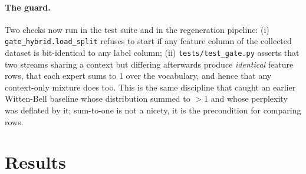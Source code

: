 \documentclass[11pt]{article}
\begin{document}
\paragraph{The guard.} Two checks now run in the test suite and in the
regeneration pipeline:
(i) \texttt{gate\_hybrid.load\_split} refuses to start if any feature column of
the collected dataset is bit-identical to any label column;
(ii) \texttt{tests/test\_gate.py} asserts that two streams sharing a context
but differing afterwards produce \emph{identical} feature rows, that each
expert sums to 1 over the vocabulary, and hence that any context-only mixture
does too. This is the same discipline that caught an earlier Witten-Bell
baseline whose distribution summed to $>$1 and whose perplexity was deflated by
it; sum-to-one is not a nicety, it is the precondition for comparing rows.

\section{Results}
\end{document}
